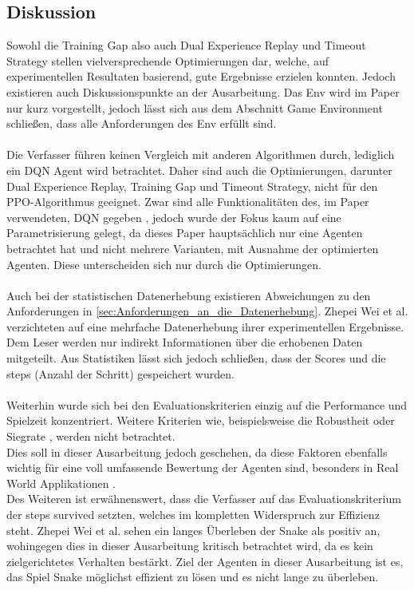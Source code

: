 \subsection{Diskussion} \label{subsec:Verwandte_Arbeiten_Paper_1_Diskussion}
Sowohl die Training Gap also auch Dual Experience Replay und Timeout Strategy stellen vielversprechende Optimierungen dar, welche, auf experimentellen Resultaten basierend, gute Ergebnisse erzielen konnten. Jedoch existieren auch Diskussionspunkte an der Ausarbeitung.
Das Env wird im Paper nur kurz vorgestellt, jedoch lässt sich aus dem Abschnitt Game Environment schließen, dass alle Anforderungen des Env  erfüllt sind.\\
\\Die Verfasser führen keinen Vergleich mit anderen Algorithmen durch, lediglich ein DQN Agent wird betrachtet. 
Daher sind auch die Optimierungen, darunter Dual Experience Replay, Training Gap und Timeout Strategy, nicht für den PPO-Algorithmus geeignet. 
Zwar sind alle Funktionalitäten des, im Paper verwendeten, DQN gegeben 
, jedoch wurde der Fokus kaum auf eine Parametrisierung  gelegt, da dieses Paper hauptsächlich nur eine Agenten betrachtet hat und nicht mehrere Varianten, mit Ausnahme der optimierten Agenten. Diese unterscheiden sich nur durch die Optimierungen.\\
\\Auch bei der statistischen Datenerhebung existieren Abweichungen zu den Anforderungen in \autoref{sec:Anforderungen_an_die_Datenerhebung}. Zhepei Wei et al. verzichteten auf eine mehrfache Datenerhebung ihrer experimentellen Ergebnisse. Dem Leser werden nur indirekt Informationen über die erhobenen Daten mitgeteilt. Aus Statistiken lässt sich jedoch schließen, dass der Scores und die steps (Anzahl der Schritt) gespeichert wurden.\\
\\Weiterhin wurde sich bei den Evaluationskriterien einzig auf die Performance und Spielzeit konzentriert. Weitere Kriterien wie, beispielsweise die Robustheit oder Siegrate , werden nicht betrachtet.\\
Dies soll in dieser Ausarbeitung jedoch geschehen, da diese Faktoren ebenfalls wichtig für eine voll umfassende Bewertung der Agenten sind, besonders in Real World Applikationen .\\ 
Des Weiteren ist erwähnenswert, dass die Verfasser auf das Evaluationskriterium der steps survived setzten, welches im kompletten Widerspruch zur Effizienz  steht. Zhepei Wei et al. sehen ein langes Überleben der Snake als positiv an, wohingegen dies in dieser Ausarbeitung kritisch betrachtet wird, da es kein zielgerichtetes Verhalten bestärkt. Ziel der Agenten in dieser Ausarbeitung ist es, das Spiel Snake möglichst effizient zu lösen und es nicht lange zu überleben.

